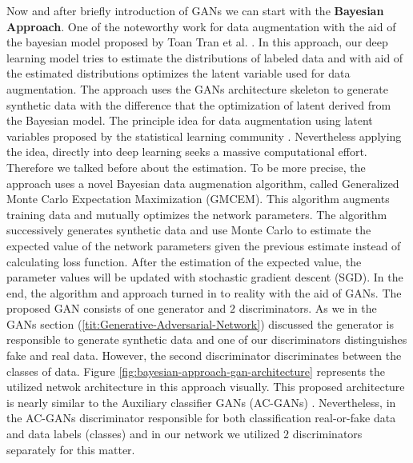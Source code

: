 Now and after briefly introduction of GANs we can start with the \textbf{Bayesian Approach}. One of
the noteworthy work for data augmentation with the aid of the bayesian model proposed by Toan Tran
et al. \cite{refrence_bayesian_approach}. In this approach, our deep learning model tries to estimate the
distributions of labeled data and with aid of the estimated distributions optimizes the latent
variable used for data augmentation. The approach uses the GANs architecture skeleton to generate
synthetic data with the difference that the optimization of latent derived from the Bayesian model.
The principle idea for data augmentation using latent variables proposed by the statistical learning
community \cite{Statistical_data_augmentation}. Nevertheless applying the idea, directly into deep
learning seeks a massive computational effort. Therefore we talked before about the estimation. To
be more precise, the
approach uses a novel Bayesian data augmenation algorithm, called Generalized Monte Carlo Expectation Maximization
(GMCEM). This algorithm augments training data and mutually optimizes the network parameters. The
algorithm successively generates synthetic data and use Monte Carlo to estimate the expected value
of the network parameters given the previous estimate instead of calculating loss function. After
the estimation of the expected value, the parameter values will be updated with stochastic gradient
descent (SGD). In the end, the algorithm and approach turned in to reality with the aid of GANs. The
proposed GAN consists of one generator and $2$ discriminators. As we in the GANs section
(\ref{tit:Generative-Adversarial-Network}) discussed the generator is responsible to generate
synthetic data and one of our discriminators distinguishes fake and real data. However, the second
discriminator discriminates between the classes of data. Figure
\ref{fig:bayesian-approach-gan-architecture} represents the utilized netwok architecture in this
approach visually. This proposed architecture is nearly similar to the Auxiliary classifier GANs
(AC-GANs) \cite{AC-GANS}. Nevertheless, in the AC-GANs discriminator responsible for both
classification real-or-fake data and data labels (classes) and in our network we utilized $2$
discriminators separately for this matter.

